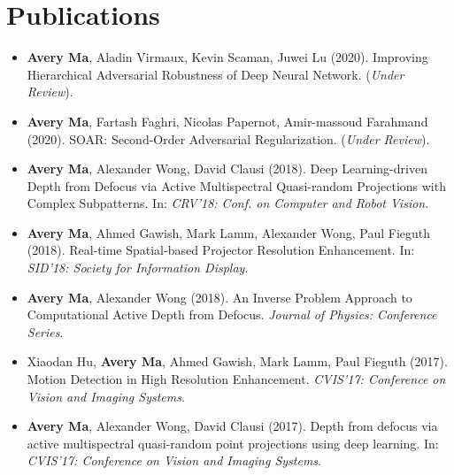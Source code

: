\section*{Publications}
    \vspace{\postsubhead}
    \begin{adjustwidth}{\indentleft}{\indentright}
        \begin{itemize}
            \setlength\itemsep{0.5em}
            
            \item \textbf{Avery Ma}, Aladin Virmaux, Kevin Scaman, Juwei Lu (2020). Improving Hierarchical Adversarial Robustness of Deep Neural Network. (\textit{Under Review}).
            
            \item \textbf{Avery Ma}, Fartash Faghri, Nicolas Papernot, Amir-massoud Farahmand (2020). SOAR: Second-Order Adversarial Regularization. (\textit{Under Review}).
            
            
            \item \textbf{Avery Ma}, Alexander Wong, David Clausi (2018). Deep Learning-driven Depth from Defocus via Active Multispectral Quasi-random Projections with Complex Subpatterns. In: \emph{CRV'18: Conf. on Computer and Robot Vision}.
            
            \item \textbf{Avery Ma}, Ahmed Gawish, Mark Lamm, Alexander Wong, Paul Fieguth (2018). Real-time Spatial-based Projector Resolution Enhancement. In: \emph{SID'18: Society for Information Display}.
            
            \item \textbf{Avery Ma}, Alexander Wong (2018). An Inverse Problem Approach to Computational Active Depth from Defocus. \emph{Journal of Physics: Conference Series}.
            
            \item Xiaodan Hu, \textbf{Avery Ma}, Ahmed Gawish, Mark Lamm, Paul Fieguth (2017). Motion Detection in High Resolution Enhancement. \emph{CVIS'17: Conference on Vision and Imaging Systems}.
            
            \item \textbf{Avery Ma}, Alexander Wong, David Clausi (2017). Depth from defocus via active multispectral quasi-random point projections using deep learning. In: \emph{CVIS'17: Conference on Vision and Imaging Systems}.
           

\end{itemize}
\end{adjustwidth}
